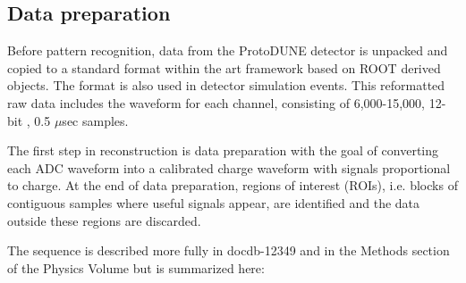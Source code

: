 \subsection{Data preparation}

Before pattern recognition, data from the ProtoDUNE detector is
unpacked and copied to a standard format within the art framework based on ROOT derived objects. 
The format is also used in detector simulation events.
This reformatted raw data includes the waveform for each channel, consisting of 6,000-15,000,  12-bit
, 0.5 $\mu$sec samples. 

The first step in reconstruction is data preparation with the goal of
converting each ADC waveform into a calibrated charge waveform with
signals proportional to charge. At the end of data preparation, regions of interest (ROIs), i.e. blocks of contiguous samples where
useful signals appear, are identified and the data outside these regions are discarded.


The sequence is described more fully in docdb-12349 and in the Methods section of the Physics Volume but is summarized here:

